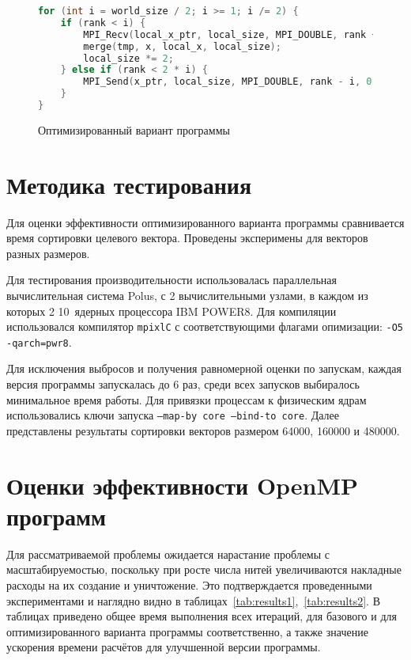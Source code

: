 \documentclass[12pt, oneside, a4paper]{article}
\begin{document}
\begin{figure}[h]
\begin{lstlisting}[language=C++]
for (int i = world_size / 2; i >= 1; i /= 2) {
	if (rank < i) {
		MPI_Recv(local_x_ptr, local_size, MPI_DOUBLE, rank + i, 0, MPI_COMM_WORLD, &Stat);
		merge(tmp, x, local_x, local_size);
		local_size *= 2;
	} else if (rank < 2 * i) {
		MPI_Send(x_ptr, local_size, MPI_DOUBLE, rank - i, 0, MPI_COMM_WORLD);
	}
}
\end{lstlisting}
\caption{Оптимизированный вариант программы}
\label{fig:optimized}
\end{figure}

\section{Методика тестирования}

Для оценки эффективности оптимизированного варианта программы сравнивается время сортировки целевого вектора. Проведены эксперимены для векторов разных размеров.

Для тестирования производительности использовалась параллельная вычислительная система Polus, с 2 вычислительными узлами, в каждом из которых 2 10~ядерных процессора IBM POWER8. Для компиляции использовался компилятор \texttt{mpixlC} с соответствующими флагами опимизации: \texttt{-O5 -qarch=pwr8}.

Для исключения выбросов и получения равномерной оценки по запускам, каждая версия программы запускалась до 6 раз, среди всех запусков выбиралось минимальное время работы. Для привязки процессам к физическим ядрам использовались ключи запуска \texttt{--map-by core --bind-to core}. Далее представлены результаты сортировки векторов размером 64000, 160000 и 480000.

\section{Оценки эффективности OpenMP программ}

Для рассматриваемой проблемы ожидается нарастание проблемы с масштабируемостью, поскольку при росте числа нитей увеличиваются накладные расходы на их создание и уничтожение. Это подтверждается проведенными экспериментами и наглядно видно в таблицах~\ref{tab:results1},~\ref{tab:results2}. В таблицах приведено общее время выполнения всех итераций, для базового и для оптимизированного варианта программы соответственно, а также значение ускорения времени расчётов для улучшенной версии программы.
\end{document}
